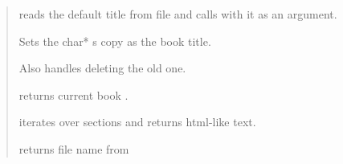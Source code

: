 \documentclass[letterpaper,10pt,english]{sphinxmanual}
\begin{document}
\begin{quote}

\begin{fulllineitems}
\label{mobireader:set_default_title}
reads the default title from file and calls {\hyperref[mobireader:mobireader::set_title__cCP]{}} with it as an argument.

\end{fulllineitems}


\begin{fulllineitems}
\label{mobireader:mobireader::set_title__cCP}
Sets the char* s copy as the book title.

Also handles deleting the old one.

\end{fulllineitems}


\begin{fulllineitems}
\label{mobireader:mobireader::get_titleC}
returns current book {\hyperref[mobireader:mobireader::title__cP]{}}.

\end{fulllineitems}


\begin{fulllineitems}
\label{mobireader:mobireader::get_htmlC}
iterates {\hyperref[mobireader:mobireader::reader__compressionP]{}} over sections and returns html-like text.

\end{fulllineitems}


\begin{fulllineitems}
\label{mobireader:mobireader::get_file_nameC}
returns file name from {\hyperref[mobireader:mobireader::input_file_name__string]{}}


\end{fulllineitems}
\end{quote}
\end{document}
